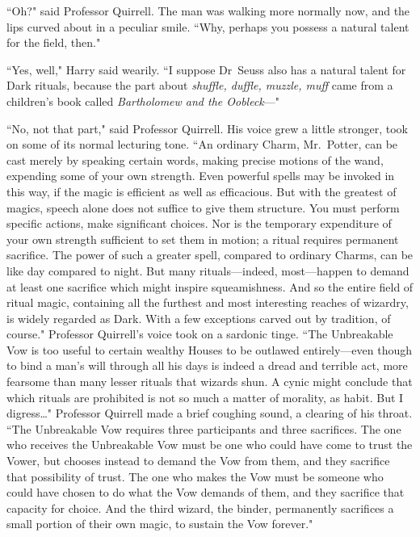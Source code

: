 ``Oh?" said Professor Quirrell. The man was walking more normally now, and the lips curved about in a peculiar smile. ``Why, perhaps you possess a natural talent for the field, then."

``Yes, well," Harry said wearily. ``I suppose Dr~Seuss also has a natural talent for Dark rituals, because the part about \emph{shuffle, duffle, muzzle, muff} came from a children's book called \emph{Bartholomew and the Oobleck}—"

``No, not that part," said Professor Quirrell. His voice grew a little stronger, took on some of its normal lecturing tone. ``An ordinary Charm, Mr.~Potter, can be cast merely by speaking certain words, making precise motions of the wand, expending some of your own strength. Even powerful spells may be invoked in this way, if the magic is efficient as well as efficacious. But with the greatest of magics, speech alone does not suffice to give them structure. You must perform specific actions, make significant choices. Nor is the temporary expenditure of your own strength sufficient to set them in motion; a ritual requires permanent sacrifice. The power of such a greater spell, compared to ordinary Charms, can be like day compared to night. But many rituals—indeed, most—happen to demand at least one sacrifice which might inspire squeamishness. And so the entire field of ritual magic, containing all the furthest and most interesting reaches of wizardry, is widely regarded as Dark. With a few exceptions carved out by tradition, of course." Professor Quirrell's voice took on a sardonic tinge. ``The Unbreakable Vow is too useful to certain wealthy Houses to be outlawed entirely—even though to bind a man's will through all his days is indeed a dread and terrible act, more fearsome than many lesser rituals that wizards shun. A cynic might conclude that which rituals are prohibited is not so much a matter of morality, as habit. But I digress{\ldots}" Professor Quirrell made a brief coughing sound, a clearing of his throat. ``The Unbreakable Vow requires three participants and three sacrifices. The one who receives the Unbreakable Vow must be one who could have come to trust the Vower, but chooses instead to demand the Vow from them, and they sacrifice that possibility of trust. The one who makes the Vow must be someone who could have chosen to do what the Vow demands of them, and they sacrifice that capacity for choice. And the third wizard, the binder, permanently sacrifices a small portion of their own magic, to sustain the Vow forever."

